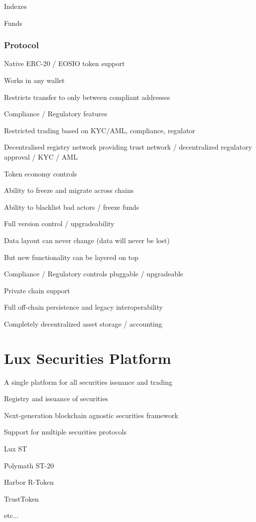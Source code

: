 \documentclass[11pt]{article}
\begin{document}
Indexes


Funds


\subsubsection{Protocol}

Native ERC-20 / EOSIO token support


Works in any wallet


Restricts transfer to only between compliant addresses


Compliance / Regulatory features


Restricted trading based on KYC/AML, compliance, regulator


Decentralised registry network providing trust network / decentralized regulatory approval / KYC / AML


Token economy controls


Ability to freeze and migrate across chains


Ability to blacklist bad actors / freeze funds


Full version control / upgradeability


Data layout can never change (data will never be lost)


But new functionality can be layered on top


Compliance / Regulatory controls pluggable / upgradeable


Private chain support


Full off-chain persistence and legacy interoperability


Completely decentralized asset storage / accounting


\section{Lux Securities Platform}

A single platform for all securities issuance and trading


Registry and issuance of securities


Next-generation blockchain agnostic securities framework


Support for multiple securities protocols


Lux ST


Polymath ST-20


Harbor R-Token


TrustToken


etc...
\end{document}
